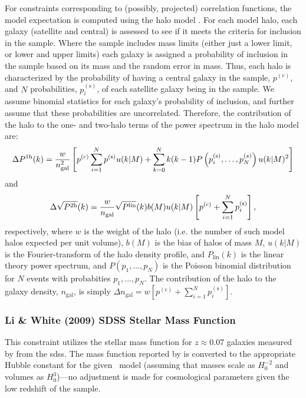 For constraints corresponding to (possibly, projected) correlation functions, the model expectation is computed using the halo model \cite{cooray_halo_2002}. For each model halo, each galaxy (satellite and central) is assessed to see if it meets the criteria for inclusion in the sample. Where the sample includes mass limits (either just a lower limit, or lower and upper limits) each galaxy is assigned a probability of inclusion in the sample based on its mass and the random error in mass. Thus, each halo is characterized by the probability of having a central galaxy in the sample, $p^\mathrm{(c)}$, and $N$ probabilities, $p_i^\mathrm{(s)}$, of each satellite galaxy being in the sample. We assume binomial statistics for each galaxy's probability of inclusion, and further assume that these probabilities are uncorrelated. Therefore, the contribution of the halo to the one- and two-halo terms of the power spectrum in the halo model are:
\begin{equation}
\Delta P^\mathrm{1h}(k) = {w \over n_\mathrm{gal}^2} \left[ p^\mathrm{(c)} \sum_{i=1}^N p^\mathrm{(s)} u(k|M) + \sum_{k=0}^N k(k-1) P\left(p_i^\mathrm{(s)},\ldots,p_N^{(s)}\right) u(k|M)^2 \right]
\end{equation}
and
\begin{equation}
\Delta \sqrt{P^\mathrm{2h}}(k) = {w \over n_\mathrm{gal}} \sqrt{P^\mathrm{lin}}(k) b(M) u(k|M) \left[ p^\mathrm{(c)} + \sum_{i=1}^N p_i^\mathrm{(s)} \right],
\end{equation}
respectively, where $w$ is the weight of the halo (i.e. the number of such model halos expected per unit volume), $b(M)$ is the bias of halos of mass $M$, $u(k|M)$ is the Fourier-transform of the halo density profile, and $P_\mathrm{lin}(k)$ is the linear theory power spectrum, and $P(p_1,\ldots,p_N)$ is the Poisson binomial distribution for $N$ events with probabities $p_1,\ldots,p_N$. The contribution of the halo to the galaxy density, $n_\mathrm{gal}$, is simply $\Delta n_\mathrm{gal} = w \left[ p^\mathrm{(c)} + \sum_{i=1}^N p_i^\mathrm{(s)} \right]$.

\subsubsection{Li \& White (2009) SDSS Stellar Mass Function}

This constraint utilizes the stellar mass function for $z\approx 0.07$ galaxies measured by \cite{li_distribution_2009} from the \gls{sdss}. The mass function reported by \cite{li_distribution_2009} is converted to the appropriate Hubble constant for the given \glc\ model (assuming that masses scale as $H_0^{-2}$ and volumes as $H_0^3$)---no adjustment is made for cosmological parameters given the low redshift of the sample.

